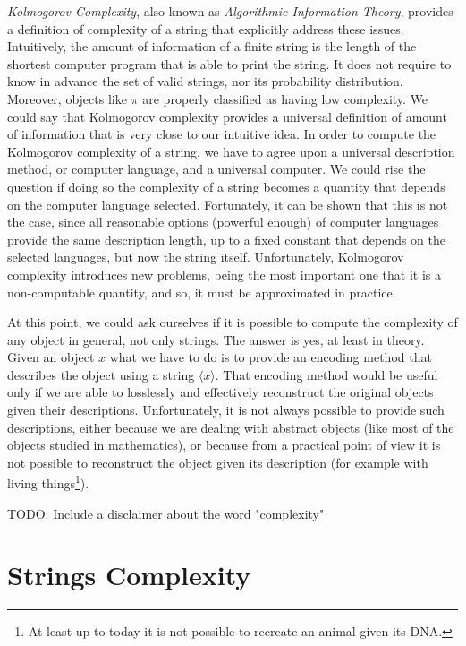 \emph{Kolmogorov Complexity}, also known as \emph{Algorithmic Information Theory}, provides a definition of complexity of a string that explicitly address these issues. Intuitively, the amount of information of a finite string is the length of the shortest computer program that is able to print the string. It does not require to know in advance the set of valid strings, nor its probability distribution. Moreover, objects like $\pi$ are properly classified as having low complexity. We could say that Kolmogorov complexity provides a universal definition of amount of information that is very close to our intuitive idea. In order to compute the Kolmogorov complexity of a string, we have to agree upon a universal description method, or computer language, and a universal computer. We could rise the question if doing so the complexity of a string becomes a quantity that depends on the computer language selected. Fortunately, it can be shown that this is not the case, since all reasonable options (powerful enough) of computer languages provide the same description length, up to a fixed constant that depends on the selected languages, but now the string itself. Unfortunately, Kolmogorov complexity introduces new problems, being the most important one that it is a non-computable quantity, and so, it must be approximated in practice.

At this point, we could ask ourselves if it is possible to compute the complexity of any object in general, not only strings. The answer is yes, at least in theory. Given an object $x$ what we have to do is to provide an encoding method that describes the object using a string $\langle x \rangle$. That encoding method would be useful only if we are able to losslessly and effectively reconstruct the original objects given their descriptions. Unfortunately, it is not always possible to provide such descriptions, either because we are dealing with abstract objects (like most of the objects studied in mathematics), or because from a practical point of view it is not possible to reconstruct the object given its description (for example with living things\footnote{At least up to today it is not possible to recreate an animal given its DNA.}).

{\color{red} TODO: Include a disclaimer about the word "complexity"}

%
%

\section{Strings Complexity}
\label{sec:strings_complexity}

